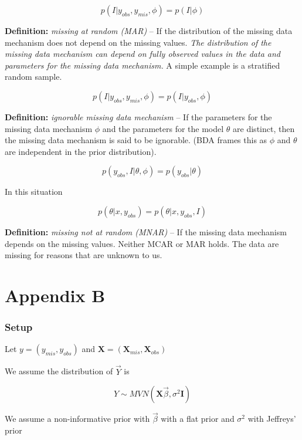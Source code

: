\documentclass[11pt]{article}
\begin{document}
$$p(I|y_{obs}, y_{mis}, \phi) = p(I| \phi)$$

\vspace{0.25in}

\textbf{Definition:} \textit{missing at random (MAR)} -- If the distribution of the missing data mechanism does not depend on the missing values. \textit{The distribution of the missing data mechanism can depend on fully observed values in the data and parameters for the missing data mechanism.} A simple example is a stratified random sample. 

$$p(I|y_{obs}, y_{mis}, \phi) = p(I|y_{obs}, \phi)$$

\vspace{0.25in}

\textbf{Definition:} \textit{ignorable missing data mechanism} -- If the parameters for the missing data mechanism $\phi$ and the parameters for the model $\theta$ are distinct, then the missing data mechanism is said to be ignorable. (BDA frames this as $\phi$ and $\theta$ are independent in the prior distribution). 

$$p(y_{obs},I|\theta, \phi) = p(y_{obs}|\theta)$$

In this situation

$$p(\theta|x, y_{obs}) = p(\theta|x, y_{obs}, I)$$

\vspace{0.25in}

\textbf{Definition:} \textit{missing not at random (MNAR)} -- If the missing data mechanism depends on the missing values. Neither MCAR or MAR holds. The data are missing for reasons that are unknown to us. 

\vspace{0.5in}

\newpage
\section{Appendix B}

\subsubsection{Setup}

Let $y = (y_{mis}, y_{obs})$ and $\mathbf{X} = (\mathbf{X}_{mis}, \mathbf{X}_{obs})$

We assume the distribution of $\vec{Y}$ is

$$Y \sim MVN(\mathbf{X}\vec{\beta}, \sigma^2\mathbf{I})$$

We assume a non-informative prior with $\vec{\beta}$ with a flat prior and $\sigma^2$ with Jeffreys' prior
\end{document}
